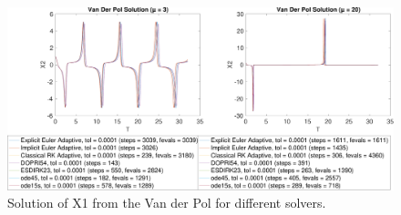 \begin{figure}[h]
    \centering
    \includegraphics[width=\textwidth]{plots/7_5_X2.pdf}
    \caption{Solution of X1 from the Van der Pol for different solvers.}
    \label{fig:7_5x2}
\end{figure}




